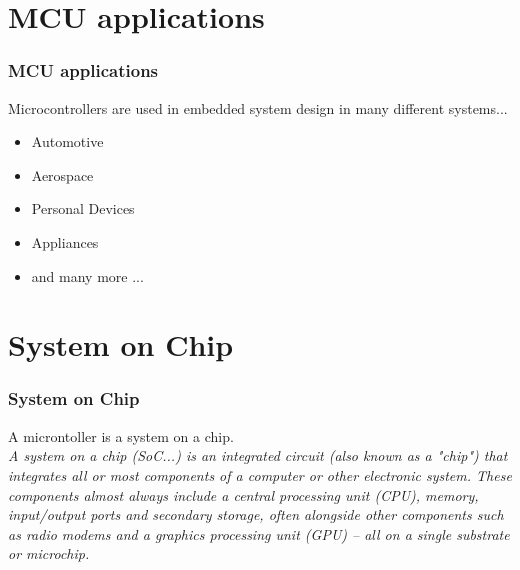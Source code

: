 \documentclass[fleqn]{beamer} %
\newcommand{\sectiontitleII}{MCU applications}
\newcommand{\sectiontitleIII}{System on Chip}
\begin{document}
\section{\sectiontitleII}

	\begin{frame}[label=sectionII,containsverbatim] \small
		\frametitle{\sectiontitleII}

		Microcontrollers are used in embedded system design in many different systems...
		
		\begin{itemize}
			
			\item Automotive 
			\item Aerospace
			\item Personal Devices
			\item Appliances
			\item and many more ...
			
		\end{itemize}
		
		
	\end{frame}


\section{\sectiontitleIII}

	\begin{frame}[label=sectionIII,containsverbatim] \small
	\frametitle{\sectiontitleIII}

	A microntoller is a system on a chip. \vspace{5mm}\\
	
	{\it A system on a chip (SoC...) is an integrated circuit (also known as a "chip") that integrates all or most components of a computer or other electronic system. These components almost always include a central processing unit (CPU), memory, input/output ports and secondary storage, often alongside other components such as radio modems and a graphics processing unit (GPU) – all on a single substrate or microchip. }

	\end{frame}
\end{document}
